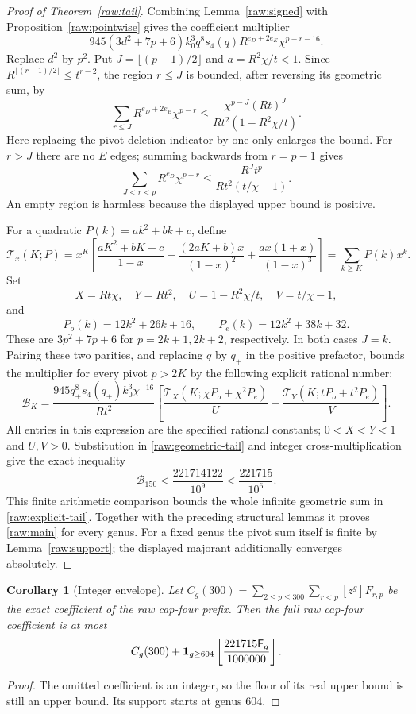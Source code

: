 \documentclass[11pt]{amsart}
\newtheorem{corollary}[theorem]{Corollary}
\theoremstyle{definition}
\theoremstyle{remark}
\newcommand{\Fib}{\mathsf F}
\numberwithin{equation}{section}
\begin{document}
\begin{proof}[Proof of Theorem~\ref{raw:tail}]
Combining Lemma~\ref{raw:signed} with Proposition~\ref{raw:pointwise}
gives the coefficient multiplier
\[
 945(3d^2+7p+6)k_0^3q^8s_4(q)
                 R^{e_D+2e_E}\chi^{p-r-16}.
\]
Replace $d^2$ by $p^2$.  Put $J=\lfloor(p-1)/2\rfloor$ and
$a=R^2\chi/t<1$.  Since
$R^{\lfloor(r-1)/2\rfloor}\le t^{r-2}$, the region $r\le J$
is bounded, after reversing its geometric sum, by
\[
 \sum_{r\le J}R^{e_D+2e_E}\chi^{p-r}
 \le\frac{\chi^{p-J}(Rt)^J}{Rt^2(1-R^2\chi/t)}.
\]
Here replacing the pivot-deletion indicator by one only enlarges the
bound.  For $r>J$ there are no $E$ edges; summing backwards from
$r=p-1$ gives
\[
 \sum_{J<r<p}R^{e_D}\chi^{p-r}
 \le\frac{R^Jt^p}{Rt^2(t/\chi-1)}.
\]
An empty region is harmless because the displayed upper bound is positive.

For a quadratic $P(k)=ak^2+bk+c$, define
\begin{equation}\label{raw:geometric-tail}
 \mathcal T_x(K;P)=x^K\left[
 \frac{aK^2+bK+c}{1-x}
 +\frac{(2aK+b)x}{(1-x)^2}
 +\frac{ax(1+x)}{(1-x)^3}\right]
 =\sum_{k\ge K}P(k)x^k.
\end{equation}
Set
\[
 X=Rt\chi,\quad Y=Rt^2,\quad U=1-R^2\chi/t,\quad V=t/\chi-1,
\]
and
\[
 P_o(k)=12k^2+26k+16,\qquad P_e(k)=12k^2+38k+32.
\]
These are $3p^2+7p+6$ for $p=2k+1,2k+2$, respectively.
In both cases $J=k$.  Pairing these two parities, and replacing $q$
by $q_+$ in the positive prefactor, bounds the multiplier for every
pivot $p>2K$ by the following explicit rational number:
\begin{equation}\label{raw:explicit-tail}
 \mathcal B_K=
 \frac{945q_+^8s_4(q_+)k_0^3\chi^{-16}}{Rt^2}
 \left[
 \frac{\mathcal T_X(K;\chi P_o+\chi^2P_e)}{U}
 +\frac{\mathcal T_Y(K;tP_o+t^2P_e)}{V}
 \right].
\end{equation}
All entries in this expression are the specified rational constants;
$0<X<Y<1$ and $U,V>0$.
Substitution in \eqref{raw:geometric-tail} and integer cross-multiplication
give the exact inequality
\[
 \mathcal B_{150}<\frac{221714122}{10^9}
                       <\frac{221715}{10^6}.
\]
This finite arithmetic comparison bounds the whole infinite geometric
sum in \eqref{raw:explicit-tail}.  Together with the preceding structural
lemmas it proves \eqref{raw:main} for every genus.  For a fixed genus
the pivot sum itself is finite by Lemma~\ref{raw:support}; the displayed
majorant additionally converges absolutely.
\end{proof}

\begin{corollary}[Integer envelope]\label{raw:integer-envelope}
Let $C_g(300)=\sum_{2\le p\le300}\sum_{r<p}[z^g]F_{r,p}$ be the
exact coefficient of the raw cap-four prefix.  Then the full raw
cap-four coefficient is at most
\[
 C_g(300)+{\bf1}_{g\ge604}
              \left\lfloor\frac{221715\Fib_g}{1000000}\right\rfloor.
\]
\end{corollary}
\begin{proof}
The omitted coefficient is an integer, so the floor of its real upper
bound is still an upper bound.  Its support starts at genus $604$.
\end{proof}
\end{document}
